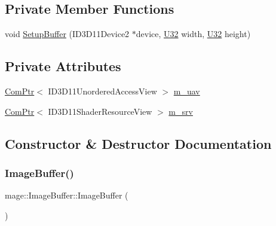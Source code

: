 \subsection*{Private Member Functions}
\begin{DoxyCompactItemize}
\item 
void \hyperlink{structmage_1_1_image_buffer_aff1f615f00acd22d67ed2d10c33feb82}{Setup\+Buffer} (I\+D3\+D11\+Device2 $\ast$device, \hyperlink{namespacemage_a41c104c036fba3756a74e19f793eeaa1}{U32} width, \hyperlink{namespacemage_a41c104c036fba3756a74e19f793eeaa1}{U32} height)
\end{DoxyCompactItemize}
\subsection*{Private Attributes}
\begin{DoxyCompactItemize}
\item 
\hyperlink{namespacemage_ae74f374780900893caa5555d1031fd79}{Com\+Ptr}$<$ I\+D3\+D11\+Unordered\+Access\+View $>$ \hyperlink{structmage_1_1_image_buffer_abd30a4842e00bb7729b3c92029e34ee0}{m\+\_\+uav}
\item 
\hyperlink{namespacemage_ae74f374780900893caa5555d1031fd79}{Com\+Ptr}$<$ I\+D3\+D11\+Shader\+Resource\+View $>$ \hyperlink{structmage_1_1_image_buffer_a3909901d1e896e85664b68b59c7c166c}{m\+\_\+srv}
\end{DoxyCompactItemize}


\subsection{Constructor \& Destructor Documentation}
\hypertarget{structmage_1_1_image_buffer_a56adf7564a85ec33716e40fbd0d1956c}{}\label{structmage_1_1_image_buffer_a56adf7564a85ec33716e40fbd0d1956c} 
\subsubsection{\texorpdfstring{Image\+Buffer()}{ImageBuffer()}\hspace{0.1cm}{\footnotesize\ttfamily [1/4]}}
{\footnotesize\ttfamily mage\+::\+Image\+Buffer\+::\+Image\+Buffer (\begin{DoxyParamCaption}{ }\end{DoxyParamCaption})}

\hypertarget{structmage_1_1_image_buffer_aaa39b98fe308c01bcb4b9aa719c79149}{}\label{structmage_1_1_image_buffer_aaa39b98fe308c01bcb4b9aa719c79149} 

